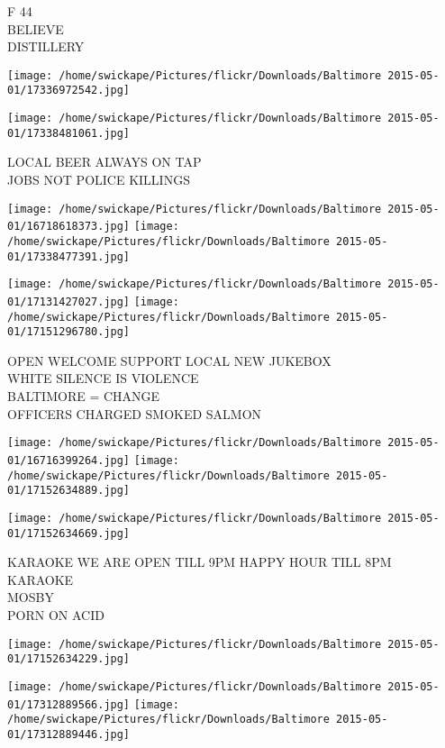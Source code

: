 \documentclass[10pt,letterpaper]{article}
\begin{document}
F 44\\
BELIEVE\\
DISTILLERY
\pagebreak

\texttt{[image: /home/swickape/Pictures/flickr/Downloads/Baltimore 2015-05-01/17336972542.jpg]}

\vspace{0.25in}
\texttt{[image: /home/swickape/Pictures/flickr/Downloads/Baltimore 2015-05-01/17338481061.jpg]}

LOCAL BEER ALWAYS ON TAP\\
JOBS NOT POLICE KILLINGS
\pagebreak

\texttt{[image: /home/swickape/Pictures/flickr/Downloads/Baltimore 2015-05-01/16718618373.jpg]}
\texttt{[image: /home/swickape/Pictures/flickr/Downloads/Baltimore 2015-05-01/17338477391.jpg]}

\texttt{[image: /home/swickape/Pictures/flickr/Downloads/Baltimore 2015-05-01/17131427027.jpg]}
\texttt{[image: /home/swickape/Pictures/flickr/Downloads/Baltimore 2015-05-01/17151296780.jpg]}

OPEN WELCOME SUPPORT LOCAL NEW JUKEBOX\\
WHITE SILENCE IS VIOLENCE\\
BALTIMORE = CHANGE\\
OFFICERS CHARGED SMOKED SALMON
\pagebreak

\texttt{[image: /home/swickape/Pictures/flickr/Downloads/Baltimore 2015-05-01/16716399264.jpg]}
\texttt{[image: /home/swickape/Pictures/flickr/Downloads/Baltimore 2015-05-01/17152634889.jpg]}

\texttt{[image: /home/swickape/Pictures/flickr/Downloads/Baltimore 2015-05-01/17152634669.jpg]}

KARAOKE WE ARE OPEN TILL 9PM HAPPY HOUR TILL 8PM KARAOKE\\
MOSBY\\
PORN ON ACID
\pagebreak

\texttt{[image: /home/swickape/Pictures/flickr/Downloads/Baltimore 2015-05-01/17152634229.jpg]}

\vspace{0.25in}
\texttt{[image: /home/swickape/Pictures/flickr/Downloads/Baltimore 2015-05-01/17312889566.jpg]}
\texttt{[image: /home/swickape/Pictures/flickr/Downloads/Baltimore 2015-05-01/17312889446.jpg]}
\end{document}
